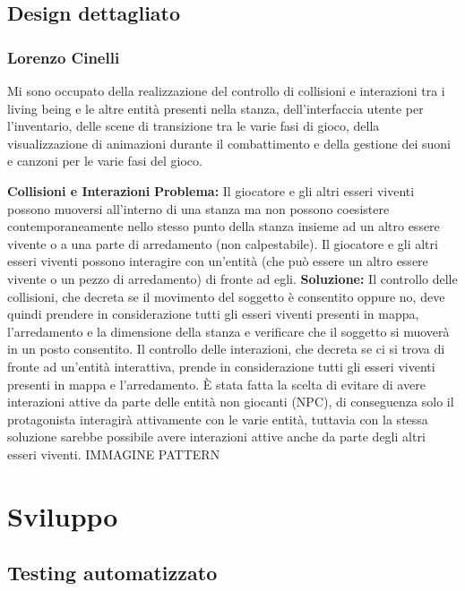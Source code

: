 \documentclass[a4paper,12pt]{report}
\begin{document}
\section{Design dettagliato}

\subsection{Lorenzo Cinelli}
Mi sono occupato della realizzazione del controllo di collisioni e interazioni tra i living being e le altre entità presenti nella stanza, 
dell'interfaccia utente per l'inventario, delle scene di transizione tra le varie fasi di gioco, della visualizzazione di animazioni durante il combattimento
e della gestione dei suoni e canzoni per le varie fasi del gioco.

\textbf{Collisioni e Interazioni}
\textbf{Problema:} Il giocatore e gli altri esseri viventi possono muoversi all'interno di una stanza ma non possono coesistere 
contemporaneamente nello stesso punto della stanza insieme ad un altro essere vivente o a una parte di arredamento (non calpestabile).
Il giocatore e gli altri esseri viventi possono interagire con un'entità (che può essere un altro essere vivente o un pezzo di arredamento)
di fronte ad egli. 
\textbf{Soluzione:} Il controllo delle collisioni, che decreta se il movimento del soggetto è consentito oppure no, deve quindi prendere in considerazione
tutti gli esseri viventi presenti in mappa, l'arredamento e la dimensione della stanza e verificare che il soggetto si muoverà in un posto consentito.
Il controllo delle interazioni, che decreta se ci si trova di fronte ad un'entità interattiva, prende in considerazione
tutti gli esseri viventi presenti in mappa e l'arredamento. 
È stata fatta la scelta di evitare di avere interazioni attive da parte delle entità non giocanti (NPC), di conseguenza solo il protagonista interagirà
attivamente con le varie entità, tuttavia con la stessa soluzione sarebbe possibile avere interazioni attive anche da parte degli altri esseri viventi.
IMMAGINE
PATTERN

\chapter{Sviluppo}
\section{Testing automatizzato}
\end{document}
